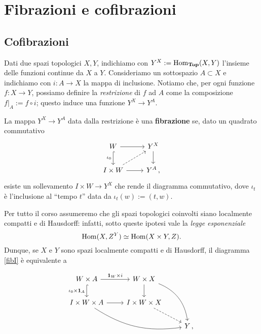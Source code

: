 
\chapter{Fibrazioni e cofibrazioni}

\section{Cofibrazioni}


Dati due spazi topologici $X,Y$, 
indichiamo con $Y^{X} := \operatorname{Hom}_{{\normalfont\textbf{Top}}}(X,Y)$
l'insieme delle funzioni continue da $X$ a $Y$.
Consideriamo un sottospazio $A \subset X$
e indichiamo con $i:A \to X$ la mappa di inclusione.
Notiamo che, per ogni funzione $f:X \to Y$,
possiamo definire la \emph{restrizione} di $f$ ad $A$
come la composizione $f\vert_{A} := f \circ i$;
questo induce una funzione $Y^{X} \to Y^{A}$.

\begin{df}
	La mappa $Y^{X} \to Y^{A}$ data dalla restrizione è una
	\textbf{fibrazione} se, dato un quadrato commutativo
	\begin{equation}\label{fibI}
		\begin{tikzcd}
			W \ar[r] \ar[d, hook, "\iota_{0}"'] & Y^{X} \ar[d] \\
			I \times W \ar[r] \ar[ur, dashed] & Y^{A}\,,
		\end{tikzcd}
	\end{equation}
	esiste un sollevamento $I \times W \to Y^{X}$ che rende
	il diagramma commutativo, dove $\iota_{t}$ è
	l'inclusione al ``tempo $t$'' data da $\iota_{t}(w) := (t,w)$.
\end{df}

Per tutto il corso assumeremo che gli spazi topologici coinvolti siano
localmente compatti e di Hausdorff:
infatti, sotto queste ipotesi vale la \emph{legge esponenziale}
\begin{equation}\label{exp-law}
	\operatorname{Hom}(X,Z^{Y}) \simeq \operatorname{Hom}(X \times Y, Z).
\end{equation}
Dunque, se $X$ e $Y$ sono spazi localmente compatti e di Hausdorff,
il diagramma \eqref{fibI} è equivalente a

	\begin{equation*} %
		\begin{tikzcd}
			W \times A  \ar[r, "\cat{1}_{W} \times i"]
			 \ar[d, hook, "\iota_{0} \times \cat{1}_{A}"'] 
			 & W \times X \ar[d]  \ar[ddr, bend left] & \\
			I \times W \times A \ar[r]  \ar[drr, bend right=20pt]
			& I \times W \times X \ar[dr, dashed] & \\
			& & Y \,,
		\end{tikzcd}
	\end{equation*}
	
